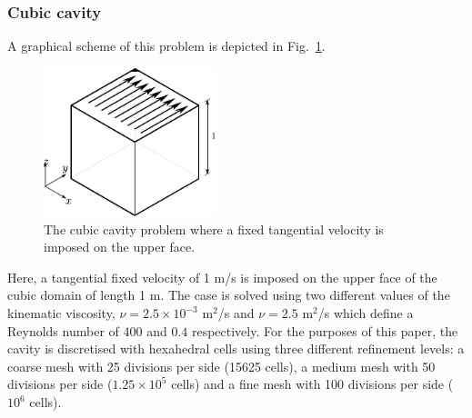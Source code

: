 \documentclass[final,3p,times,11pt,onecolumn]{myElsarticle}
\numberwithin{equation}{section}
\begin{document}
\subsubsection{Cubic cavity}
 A graphical scheme of this problem is depicted in Fig.~\ref{Fig:Cavity}.
\begin{figure}[t!!!]
\centering
\includegraphics[width=5cm]{fig/Cases/Cavity.pdf}
\caption{The cubic cavity problem where a fixed tangential velocity is imposed on the upper face.}
\label{Fig:Cavity}
\end{figure} 
Here, a tangential fixed velocity of 1 m/s is imposed on the upper face of the cubic domain of length 1 m. The case is solved using two different values of the kinematic viscosity, $\nu = 2.5 \times 10^{-3}$ m$^2$/s and $\nu = 2.5$ m$^2$/s which define a Reynolds number of 400 and $0.4$ respectively. For the purposes of this paper, the cavity is discretised with hexahedral cells using three different refinement levels: a coarse mesh with 25 divisions per side (15625 cells), a medium mesh with 50 divisions per side ($1.25 \times 10^{5}$ cells) and a fine mesh with 100 divisions per side ($10^{6}$ cells).
\end{document}
